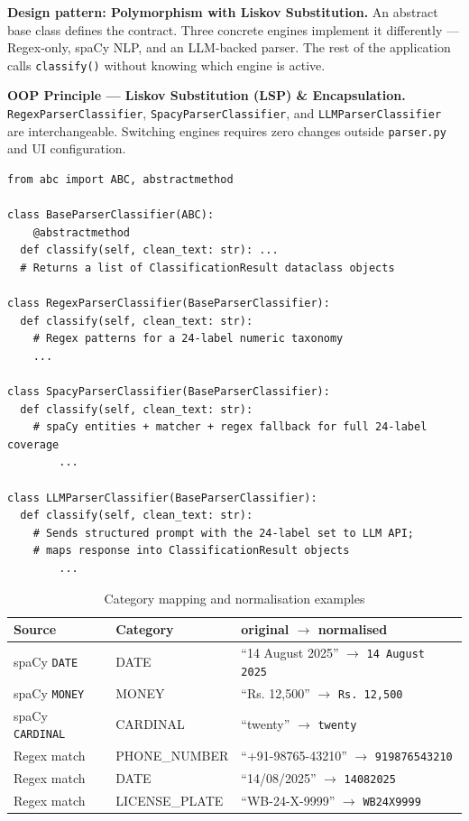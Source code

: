 \documentclass[12pt, a4paper]{article}
\begin{document}
\textbf{Design pattern: Polymorphism with Liskov Substitution.} An abstract
base class defines the contract. Three concrete engines implement it
differently --- Regex-only, spaCy NLP, and an LLM-backed parser.
The rest of the application calls \texttt{classify()} without knowing which
engine is active.
 
\begin{mdframed}[style=patternbox]
\textbf{OOP Principle --- Liskov Substitution (LSP) \& Encapsulation.}
\texttt{RegexParserClassifier}, \texttt{SpacyParserClassifier}, and
\texttt{LLMParserClassifier} are interchangeable. Switching engines requires
zero changes outside \texttt{parser.py} and UI configuration.
\end{mdframed}
 
\begin{lstlisting}[caption={parser.py --- abstract base and two concrete engines}]
from abc import ABC, abstractmethod
 
class BaseParserClassifier(ABC):
    @abstractmethod
  def classify(self, clean_text: str): ...
  # Returns a list of ClassificationResult dataclass objects
 
class RegexParserClassifier(BaseParserClassifier):
  def classify(self, clean_text: str):
    # Regex patterns for a 24-label numeric taxonomy
    ...

class SpacyParserClassifier(BaseParserClassifier):
  def classify(self, clean_text: str):
    # spaCy entities + matcher + regex fallback for full 24-label coverage
        ...
 
class LLMParserClassifier(BaseParserClassifier):
  def classify(self, clean_text: str):
    # Sends structured prompt with the 24-label set to LLM API;
    # maps response into ClassificationResult objects
        ...
\end{lstlisting}
 
\begin{table}[H]
\centering
\caption{Category mapping and normalisation examples}
\renewcommand{\arraystretch}{1.3}
\begin{tabular}{l l l}
\toprule
\textbf{Source} & \textbf{Category} & \textbf{original $\to$ normalised} \\
\midrule
spaCy \texttt{DATE}     & DATE           & ``14 August 2025'' $\to$ \texttt{14 August 2025} \\
spaCy \texttt{MONEY}    & MONEY          & ``Rs. 12,500'' $\to$ \texttt{Rs. 12,500} \\
spaCy \texttt{CARDINAL} & CARDINAL       & ``twenty'' $\to$ \texttt{twenty} \\
Regex match             & PHONE\_NUMBER & ``+91-98765-43210'' $\to$ \texttt{919876543210} \\
Regex match             & DATE           & ``14/08/2025'' $\to$ \texttt{14082025} \\
Regex match             & LICENSE\_PLATE & ``WB-24-X-9999'' $\to$ \texttt{WB24X9999} \\
\bottomrule
\end{tabular}
\end{table}
 
\end{document}
